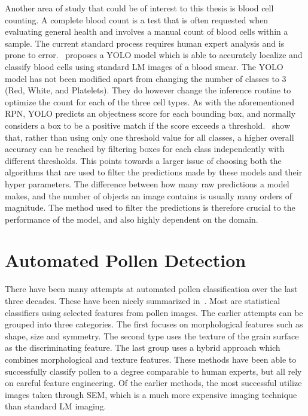 Another area of study that could be of interest to this thesis is blood cell counting.
A complete blood count is a test that is often requested when evaluating general health and involves a manual count of blood cells within a sample.
The current standard process requires human expert analysis and is prone to error.~\cite{islam_machine_2019} proposes a YOLO model which is able to accurately localize and classify blood cells using standard LM images of a blood smear.
The YOLO model has not been modified apart from changing the number of classes to 3 (Red, White, and Platelets).
They do however change the inference routine to optimize the count for each of the three cell types.
As with the aforementioned RPN, YOLO predicts an objectness score for each bounding box, and normally considers a box to be a positive match if the score exceeds a threshold.~\citeauthor{islam_machine_2019} show that, rather than using only one threshold value for all classes, a higher overall accuracy can be reached by filtering boxes for each class independently with different thresholds.
This points towards a larger issue of choosing both the algorithms that are used to filter the predictions made by these models and their hyper parameters.
The difference between how many raw predictions a model makes, and the number of objects an image contains is usually many orders of magnitude.
The method used to filter the predictions is therefore crucial to the performance of the model, and also highly dependent on the domain.

\section{Automated Pollen Detection}\label{sec:rel-pollen}
There have been many attempts at automated pollen classification over the last three decades.
These have been nicely summarized in~\cite{sevillano_improving_2018}.
Most are statistical classifiers using selected features from pollen images.
The earlier attempts can be grouped into three categories.
The first focuses on morphological features such as shape, size and symmetry.
The second type uses the texture of the grain surface as the discriminating feature.
The last group uses a hybrid approach which combines morphological and texture features.
These methods have been able to successfully classify pollen to a degree comparable to human experts, but all rely on careful feature engineering.
Of the earlier methods, the most successful utilize images taken through SEM, which is a much more expensive imaging technique than standard LM imaging.

